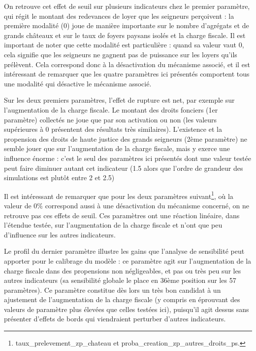 On retrouve cet effet de seuil sur plusieurs indicateurs chez le premier paramètre, qui régit le montant des redevances de loyer que les seigneurs perçoivent : la première modalité (0) joue de manière importante sur le nombre d'agrégats et de grands châteaux et sur le taux de foyers paysans isolés et la charge fiscale.
Il est important de noter que cette modalité est particulière : quand sa valeur vaut 0, cela signifie que les seigneurs ne gagnent pas de puissance sur les loyers qu'ils prélèvent.
Cela correspond donc à la désactivation du mécanisme associé, et il est intéressant de remarquer que les quatre paramètres ici présentés comportent tous une modalité qui désactive le mécanisme associé.

Sur les deux premiers paramètres, l'effet de rupture est net, par exemple sur l'augmentation de la charge fiscale.
Le montant des droits fonciers (1er paramètre) collectés ne joue que par son activation ou non (les valeurs supérieures à 0 présentent des résultats très similaires).
L'existence et la propension des droits de haute justice des grands seigneurs (2ème paramètre) ne semble jouer que sur l'augmentation de la charge fiscale, mais y exerce une influence énorme : c'est le seul des paramètres ici présentés dont une valeur testée peut faire diminuer autant cet indicateur (1.5 alors que l'ordre de grandeur des simulations est plutôt entre 2 et 2.5)

Il est intéressant de remarquer que pour les deux paramètres suivant\footnote{
\textsf{taux\_prelevement\_zp\_chateau} et \textsf{proba\_creation\_zp\_autres\_droits\_ps}.
}, où la valeur de 0\% correspond aussi à une désactivation du mécanisme concerné, on ne retrouve pas ces effets de seuil.
Ces paramètres ont une réaction linéaire, dans l'étendue testée, sur l'augmentation de la charge fiscale et n'ont que peu d'influence sur les autres indicateurs.

Le profil du dernier paramètre illustre les gains que l'analyse de sensibilité peut apporter pour le calibrage du modèle : ce paramètre agit sur l'augmentation de la charge fiscale dans des propensions non négligeables, et pas ou très peu sur les autres indicateurs (sa sensibilité globale le place en 36ème position sur les 57 paramètres).
Ce paramètre constitue dès lors un très bon candidat à un ajustement de l'augmentation de la charge fiscale (y compris en éprouvant des valeurs de paramètre plus élevées que celles testées ici), puisqu'il agit dessus sans présenter d'effets de bords qui viendraient perturber d'autres indicateurs.

